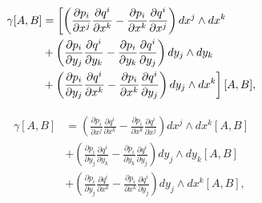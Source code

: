 \documentclass[a4paper,10pt]{article}
\numberwithin{equation}{section}
\newcommand{\zerodel}{.\kern-\nulldelimiterspace}
\begin{document}
\begin{align}
\begin{split}
 \gamma[A,B] &= \left[\left(\frac{\partial p_i}{\partial x^j}\frac{\partial q^i}{\partial x^k} 
 - \frac{\partial p_i}{\partial x^k}\frac{\partial q^i}{\partial x^j}\right)dx^j \wedge dx^k\right\zerodel \\
 &+ \left(\frac{\partial p_i}{\partial y_j}\frac{\partial q^i}{\partial y_k} 
 - \frac{\partial p_i}{\partial y_k}\frac{\partial q^i}{\partial y_j}\right)dy_j \wedge dy_k \\
 &+ \left\zerodel\left(\frac{\partial p_i}{\partial y_j}\frac{\partial q^i}{\partial x^k} 
 - \frac{\partial p_i}{\partial x^k}\frac{\partial q^i}{\partial y_j}\right)dy_j \wedge dx^k\right]
 [A,B],
\end{split}
\end{align}

\begin{align}
\begin{split}
 \gamma[A,B] &= \left(\frac{\partial p_i}{\partial x^j}\frac{\partial q^i}{\partial x^k} 
 - \frac{\partial p_i}{\partial x^k}\frac{\partial q^i}{\partial x^j}\right)dx^j \wedge dx^k[A,B] \\
 &+ \left(\frac{\partial p_i}{\partial y_j}\frac{\partial q^i}{\partial y_k} 
 - \frac{\partial p_i}{\partial y_k}\frac{\partial q^i}{\partial y_j}\right)dy_j \wedge dy_k[A,B] \\
 &+ \left(\frac{\partial p_i}{\partial y_j}\frac{\partial q^i}{\partial x^k} 
 - \frac{\partial p_i}{\partial x^k}\frac{\partial q^i}{\partial y_j}\right)dy_j \wedge dx^k[A,B],
\end{split}
\end{align}
\end{document}
